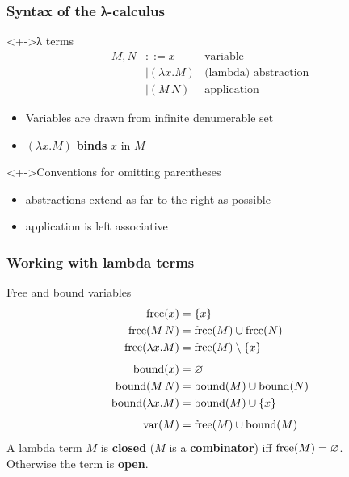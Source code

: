 \documentclass[pdftex,aspectratio=169]{beamer}
\begin{document}
\begin{frame}[fragile]
  \frametitle{Syntax of the λ-calculus}
  \begin{block}<+->{λ terms}
    \begin{align*}
      M,N & ::= x & \text{variable} \\
          & \mid (\lambda x. M) & \text{(lambda) abstraction} \\
          & \mid (M\, N) & \text{application}
    \end{align*}
    \begin{itemize}
    \item Variables are drawn from infinite denumerable set
    \item $(\lambda x. M)$ \textbf{binds} $x$ in $M$
    \end{itemize}
  \end{block}
  \begin{block}<+->{Conventions for omitting parentheses}
    \begin{itemize}
    \item abstractions extend as far to the right as possible
    \item application is left associative
    \end{itemize}
  \end{block}
\end{frame}             

\begin{frame}[fragile]
  \frametitle{Working with lambda terms}
  \begin{block}{Free and bound variables}
    \begin{align*}
    \operatorname{free}(x) & = \{ x \} \\
    \operatorname{free}(M\,N) & = \operatorname{free}(M) \cup \operatorname{free}(N) \\
    \operatorname{free}(\lambda x.M) & = \operatorname{free}(M) \setminus \{x\}\\[1ex]
    \operatorname{bound}(x) & = \varnothing\\
    \operatorname{bound}(M\,N) & = \operatorname{bound}(M) \cup \operatorname{bound}(N) \\
      \operatorname{bound}(\lambda x.M) & = \operatorname{bound}(M) \cup \{x\} \\[1ex]
      \operatorname{var} (M) & = \operatorname{free} (M) \cup \operatorname{bound} (M)
    \end{align*}
    A  lambda term $M$ is \textbf{closed} ($M$ is a
    \textbf{combinator}) iff $\operatorname{free}(M)=\varnothing$. \\
    Otherwise the term is
  \textbf{open}. 
  \end{block}
\end{frame}
\end{document}
